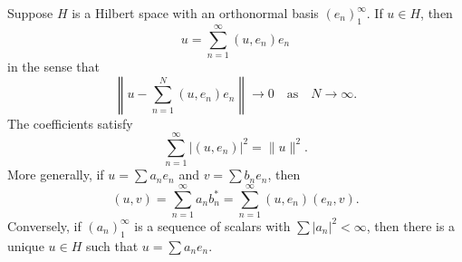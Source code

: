 Suppose $H$ is a Hilbert space with an orthonormal basis $(e_n)_{1}^{\infty}$. If $u \in H$, then
$$u = \sum_{n=1}^{\infty} (u, e_n) e_n$$
in the sense that
$$\left\| u - \sum_{n=1}^{N} (u, e_n) e_n \right\| \to 0 \quad \text{as} \quad N \to \infty.$$
The coefficients satisfy
$$\sum_{n=1}^{\infty} |(u, e_n)|^2 = \|u\|^2.$$
More generally, if $u = \sum a_n e_n$ and $v = \sum b_n e_n$, then
$$(u, v) = \sum_{n=1}^{\infty} a_n b_n^* = \sum_{n=1}^{\infty} (u, e_n)(e_n, v).$$
Conversely, if $(a_n)_{1}^{\infty}$ is a sequence of scalars with $\sum |a_n|^2 < \infty$, then there is a unique $u \in H$ such that $u = \sum a_n e_n$.
